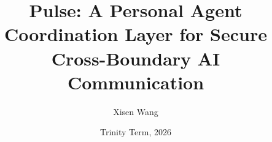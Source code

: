 \documentclass[report]{oxengthesis}
\title       {Pulse: A Personal Agent Coordination Layer for Secure Cross-Boundary AI Communication}
\author      {Xisen Wang}
\date        {Trinity Term, 2026}
\begin{document}
\frontmatter
\makefrontmatterpages

\mainmatter

















\appendix




\backmatter
\listofreferences
\end{document}
